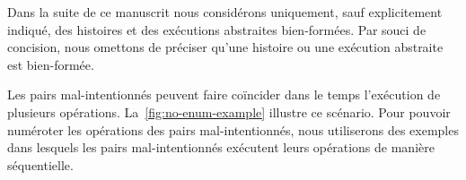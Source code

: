 \begin{remark}
Dans la suite de ce manuscrit nous considérons uniquement, sauf explicitement indiqué, des histoires et des exécutions abstraites bien-formées.
Par souci de concision, nous omettons de préciser qu'une histoire ou une exécution abstraite est bien-formée.
\end{remark}

Les pairs mal-intentionnés peuvent faire coïncider dans le temps l'exécution de plusieurs opérations.
La~\autoref{fig:no-enum-example} illustre ce scénario.
Pour pouvoir numéroter les opérations des pairs mal-intentionnés, nous utiliserons des exemples dans lesquels les pairs mal-intentionnés exécutent leurs opérations de manière séquentielle.

